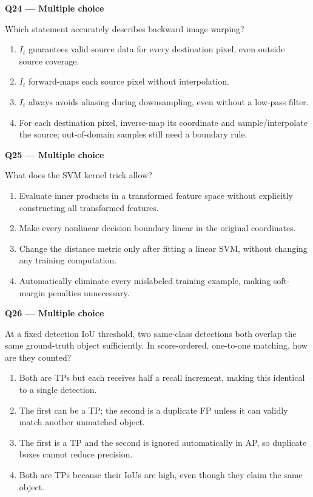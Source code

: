 \documentclass[11pt,a4paper]{article}
\begin{document}
\begin{minipage}{\linewidth}
\textbf{Q24 — Multiple choice}\par\smallskip
Which statement accurately describes backward image warping?
\begin{enumerate}[label=\textbf{\Alph*.}]
\item \(I_t\) guarantees valid source data for every destination pixel,\allowbreak{} even outside source coverage.
\item \(I_t\) forward-maps each source pixel without interpolation.
\item \(I_t\) always avoids aliasing during downsampling,\allowbreak{} even without a low-pass filter.
\item For each destination pixel,\allowbreak{} inverse-map its coordinate and sample/\allowbreak{}interpolate the source; out-of-domain samples still need a boundary rule.
\end{enumerate}
\end{minipage}
\par\vspace{12pt}
\begin{minipage}{\linewidth}
\textbf{Q25 — Multiple choice}\par\smallskip
What does the SVM kernel trick allow?
\begin{enumerate}[label=\textbf{\Alph*.}]
\item Evaluate inner products in a transformed feature space without explicitly constructing all transformed features.
\item Make every nonlinear decision boundary linear in the original coordinates.
\item Change the distance metric only after fitting a linear SVM,\allowbreak{} without changing any training computation.
\item Automatically eliminate every mislabeled training example,\allowbreak{} making soft-margin penalties unnecessary.
\end{enumerate}
\end{minipage}
\par\vspace{12pt}
\begin{minipage}{\linewidth}
\textbf{Q26 — Multiple choice}\par\smallskip
At a fixed detection IoU threshold,\allowbreak{} two same-class detections both overlap the same ground-truth object sufficiently. In score-ordered,\allowbreak{} one-to-one matching,\allowbreak{} how are they counted?
\begin{enumerate}[label=\textbf{\Alph*.}]
\item Both are TPs but each receives half a recall increment,\allowbreak{} making this identical to a single detection.
\item The first can be a TP; the second is a duplicate FP unless it can validly match another unmatched object.
\item The first is a TP and the second is ignored automatically in AP,\allowbreak{} so duplicate boxes cannot reduce precision.
\item Both are TPs because their IoUs are high,\allowbreak{} even though they claim the same object.
\end{enumerate}
\end{minipage}
\end{document}
